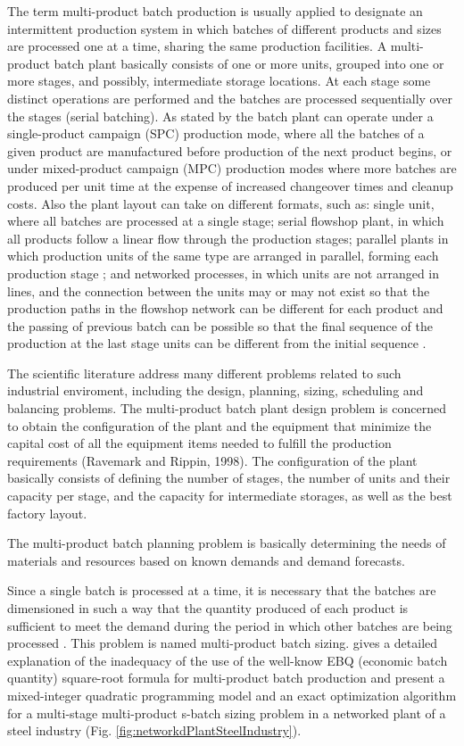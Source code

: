 \documentclass[authoryear,manuscript,12pt]{elsarticle}
\begin{document}
The term multi-product batch production is usually applied to designate an intermittent production system in which batches of different products and sizes are processed one at a time, sharing the same production facilities. A multi-product batch plant basically consists of one or more units, grouped into one or more stages, and possibly, intermediate storage locations. At each stage some distinct operations are performed and the batches are processed sequentially over the stages (serial batching). As stated by \cite{PetkovMaranas1998} the batch plant can operate under a single-product campaign (SPC) production mode, where all the batches of a given product are manufactured before production of the next product begins, or under mixed-product campaign (MPC) production modes where more batches are produced per unit time at the expense of increased changeover times and cleanup costs. Also the plant layout can take on different formats, such as: single unit, where all batches are processed at a single stage; serial flowshop plant, in which all products follow a linear flow through the production stages; parallel plants in which production units of the same type are arranged in parallel, forming each production stage \citep{MendezEtAll2000, ShiEtAll2017}; and networked processes, in which units are not arranged in lines, and the connection between the units may or may not exist so that the production paths in the flowshop network can be different for each product and the passing of previous batch can be possible so that the final sequence of the production at the last stage units can be different from the initial sequence \citep{KimEtAl1996}.

The scientific literature address many different problems related to such industrial enviroment, including the design, planning, sizing, scheduling and balancing problems. The multi-product batch plant design problem is concerned to obtain the configuration of the plant and the equipment that minimize the capital cost of all the equipment items needed to fulfill the production requirements (Ravemark and Rippin, 1998). The configuration of the plant basically consists of defining the number of stages, the number of units and their capacity per stage, and the capacity for intermediate storages, as well as the best factory layout. 

The multi-product batch planning problem is basically determining the needs of materials and resources based on known demands and demand forecasts. 

Since a single batch is processed at a time, it is necessary that the batches are dimensioned in such a way that the quantity produced of each product is sufficient to meet the demand during the period in which other batches are being processed \citep{Eilon1985}. This problem is named multi-product batch sizing. \cite{Eilon1985} gives a detailed explanation of the inadequacy of the use of the well-know EBQ (economic batch quantity) square-root formula for multi-product batch production and \cite{LiuEtAl2020} present a mixed-integer quadratic programming model and an exact optimization algorithm for a multi-stage multi-product s-batch sizing problem in a networked plant of a steel industry (Fig. \ref{fig:networkdPlantSteelIndustry}). 
\end{document}
